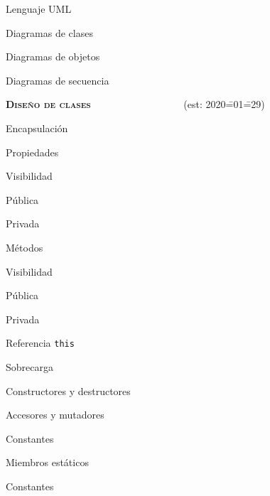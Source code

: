 \begin{longenum}
\begin{longenum}
\begin{longenum}
        \end{longenum}
        \item Lenguaje UML
        \begin{longenum}
            \item Diagramas de clases
            \item Diagramas de objetos
            \item Diagramas de secuencia
        \end{longenum}
    \end{longenum}
    \item \textbf{\textsc{Diseño de clases}} \ \ \ \ \ \ \ \ \ \ \ \ \ \ \ \ \ \ (est: 2020\==01\==29)
    \begin{longenum}
        \item Encapsulación
        \item Propiedades
        \begin{longenum}
            \item Visibilidad
            \begin{longenum}
                \item Pública
                \item Privada
            \end{longenum}
        \end{longenum}
        \item Métodos
        \begin{longenum}
            \item Visibilidad
            \begin{longenum}
                \item Pública
                \item Privada
            \end{longenum}
            \item Referencia \texttt{this}
            \item Sobrecarga
            \item Constructores y destructores
            \item Accesores y mutadores
        \end{longenum}
        \item Constantes
        \item Miembros estáticos
        \begin{longenum}
            \item Constantes

\end{longenum}
\end{longenum}
\end{longenum}
